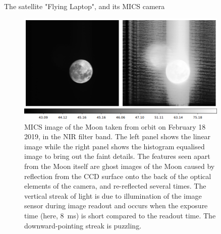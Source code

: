 \documentclass[final,hyperref={pdfpagelabels=false}]{beamer}
\begin{document}
\begin{frame}[t]
\begin{columns}[t]
\begin{column}{.23\textwidth}
\begin{block}{The satellite "Flying Laptop", and its MICS camera}
\begin{figure}
    \centering
    \vspace{-1cm}
    \includegraphics{fig/Moon2panels.png}
    \caption{MICS image of the Moon taken from orbit on February 18 2019, in the NIR filter band. The left panel shows the linear image while the right panel shows the histogram equalised image to bring  out the faint details. The features seen apart from the Moon itself are ghost images of the Moon caused by reflection from the CCD surface onto the back of the optical elements of the camera, and re-reflected several times. The vertical streak of light is due to illumination of the image sensor during image readout and occurs when the exposure time (here, \SI{8}{\milli\second}) is short compared to the readout time. The downward-pointing streak is puzzling.}
    \label{fig:my_label}
\end{figure}


\end{block}

\end{column} %
\begin{column}{.01\textwidth}\end{column} %

\begin{column}{.23\textwidth} %
\begin{block}



\end{block}
\end{column}
\end{columns}
\end{frame}
\end{document}
